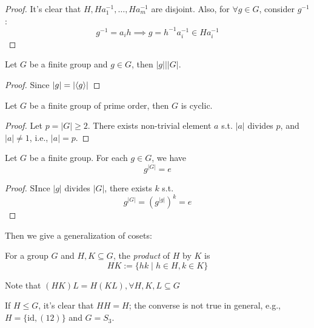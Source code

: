 \begin{proof}
It's clear that $H,Ha^{-1}_1,\dots,Ha^{-1}_m$ are disjoint. Also, for $\forall g\in G$, consider $g^{-1}$:
\[
g^{-1}=a_ih\implies
g=h^{-1}a_{i}^{-1}\in Ha_i^{-1}
\]
\end{proof}
\begin{proposition}
Let $G$ be a finite group and $g\in G$, then $|g|||G|$.
\end{proposition}
\begin{proof}
Since $|g| = |\langle g\rangle|$
\end{proof}
\begin{proposition}
Let $G$ be a finite group of prime order, then $G$ is cyclic.
\end{proposition}
\begin{proof}
Let $p=|G|\ge2$. There exists non-trivial element $a$ s.t. $|a|$ divides $p$, and $|a|\ne 1$, i.e., $|a|=p$.
\end{proof}
\begin{proposition}
Let $G$ be a finite group. For each $g\in G$, we have
\[
g^{|G|} = e
\]
\end{proposition}
\begin{proof}
SInce $|g|$ divides $|G|$, there exists $k$ s.t.
\[
g^{|G|}=(g^{|g|})^k=e
\]
\end{proof}
Then we give a generalization of cosets:
\begin{definition}[Product of $H$ by $K$]
For a group $G$ and $H,K\subseteq G$, the \emph{product} of $H$ by $K$ is 
\[
HK:=\{hk\mid h\in H,k\in K\}
\]
\end{definition}
Note that $(HK)L=H(KL),\forall H,K,L\subseteq G$

If $H\le G$, it's clear that $HH = H$; the converse is not true in general, e.g., $H=\{\mbox{id},(12)\}$ and $G=S_3$.

